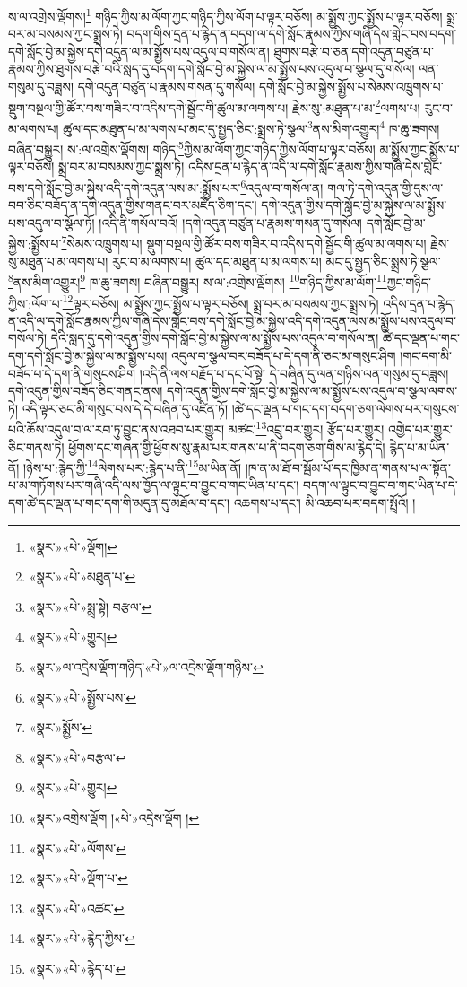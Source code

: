 ས་ལ་འགྲེས་ལྡོགས།\footnote{«སྣར་»«པེ་»ལྡོག།} གཉིད་ཀྱིས་མ་ལོག་ཀྱང་གཉིད་ཀྱིས་ལོག་པ་ལྟར་བཅོས། མ་སྨྱོས་ཀྱང་སྨྱོས་པ་ལྟར་བཅོས། སྨྲ་བར་མ་བསམས་ཀྱང་སྨྲས་ཏེ། བདག་གིས་དྲན་པ་རྙེད་ན་བདག་ལ་དགེ་སློང་རྣམས་ཀྱིས་གཞི་དེས་གླེང་བས་བདག་དགེ་སློང་བྱེ་མ་སྐྱེས་དགེ་འདུན་ལ་མ་སྨྱོས་པས་འདུལ་བ་གསོལ་ན། ཐུགས་བརྩེ་བ་ཅན་དགེ་འདུན་བཙུན་པ་རྣམས་ཀྱིས་ཐུགས་བརྩེ་བའི་སླད་དུ་བདག་དགེ་སློང་བྱེ་མ་སྐྱེས་ལ་མ་སྨྱོས་པས་འདུལ་བ་སྩལ་དུ་གསོལ། ལན་གསུམ་དུ་བཟླས། དགེ་འདུན་བཙུན་པ་རྣམས་གསན་དུ་གསོལ། དགེ་སློང་བྱེ་མ་སྐྱེས་སྨྱོས་པ་སེམས་འཁྲུགས་པ་སྡུག་བསྔལ་གྱི་ཚོར་བས་གཟིར་བ་འདིས་དགེ་སྦྱོང་གི་ཚུལ་མ་ལགས་པ། རྗེས་སུ་:མཐུན་པ་མ་\footnote{«སྣར་»«པེ་»མཐུན་པ་}ལགས་པ། རུང་བ་མ་ལགས་པ། ཚུལ་དང་མཐུན་པ་མ་ལགས་པ་མང་དུ་སྤྱད་ཅིང་:སྨྲས་ཏེ་སྩལ་\footnote{«སྣར་»«པེ་»སྨྲ་སྟེ། བརྩལ་}ནས་མིག་འགྱུར།\footnote{«སྣར་»«པེ་»གྱུར།} ཁ་ཆུ་ཟགས། བཞིན་བསྒྱུར། ས་:ལ་འགྲེས་ལྡོགས། གཉིད་\footnote{«སྣར་»ལ་འདྲེས་ལྡོག་གཉིད་«པེ་»ལ་འདྲེས་ལྡོག་གཉིས་}ཀྱིས་མ་ལོག་ཀྱང་གཉིད་ཀྱིས་ལོག་པ་ལྟར་བཅོས། མ་སྨྱོས་ཀྱང་སྨྱོས་པ་ལྟར་བཅོས། སྨྲ་བར་མ་བསམས་ཀྱང་སྨྲས་ཏེ། འདིས་དྲན་པ་རྙེད་ན་འདི་ལ་དགེ་སློང་རྣམས་ཀྱིས་གཞི་དེས་གླེང་བས་དགེ་སློང་བྱེ་མ་སྐྱེས་འདི་དགེ་འདུན་ལས་མ་:སྨྱོས་པར་\footnote{«སྣར་»«པེ་»སྨྱོས་པས་}འདུལ་བ་གསོལ་ན། གལ་ཏེ་དགེ་འདུན་གྱི་དུས་ལ་བབ་ཅིང་བཟོད་ན་དགེ་འདུན་གྱིས་གནང་བར་མཛོད་ཅིག་དང་། དགེ་འདུན་གྱིས་དགེ་སློང་བྱེ་མ་སྐྱེས་ལ་མ་སྨྱོས་པས་འདུལ་བ་སྩོལ་ཏོ། །འདི་ནི་གསོལ་བའོ། །དགེ་འདུན་བཙུན་པ་རྣམས་གསན་དུ་གསོལ། དགེ་སློང་བྱེ་མ་སྐྱེས་:སྨྱོས་པ་\footnote{«སྣར་»སྨྱོས་}སེམས་འཁྲུགས་པ། སྡུག་བསྔལ་གྱི་ཚོར་བས་གཟིར་བ་འདིས་དགེ་སྦྱོང་གི་ཚུལ་མ་ལགས་པ། རྗེས་སུ་མཐུན་པ་མ་ལགས་པ། རུང་བ་མ་ལགས་པ། ཚུལ་དང་མཐུན་པ་མ་ལགས་པ། མང་དུ་སྤྱད་ཅིང་སྨྲས་ཏེ་སྩལ་\footnote{«སྣར་»«པེ་»བརྩལ་}ནས་མིག་འགྱུར།\footnote{«སྣར་»«པེ་»གྱུར།} ཁ་ཆུ་ཟགས། བཞིན་བསྒྱུར། ས་ལ་:འགྲེས་ལྡོགས། \footnote{«སྣར་»འགྲེས་ལྡོག །«པེ་»འདྲེས་ལྡོག །}གཉིད་ཀྱིས་མ་ལོག་\footnote{«སྣར་»«པེ་»ལོགས་}ཀྱང་གཉིད་ཀྱིས་:ལོག་པ་\footnote{«སྣར་»«པེ་»ལྡོག་པ་}ལྟར་བཅོས། མ་སྨྱོས་ཀྱང་སྨྱོས་པ་ལྟར་བཅོས། སྨྲ་བར་མ་བསམས་ཀྱང་སྨྲས་ཏེ། འདིས་དྲན་པ་རྙེད་ན་འདི་ལ་དགེ་སློང་རྣམས་ཀྱིས་གཞི་དེས་གླེང་བས་དགེ་སློང་བྱེ་མ་སྐྱེས་འདི་དགེ་འདུན་ལས་མ་སྨྱོས་པས་འདུལ་བ་གསོལ་ཏེ། དེའི་སླད་དུ་དགེ་འདུན་གྱིས་དགེ་སློང་བྱེ་མ་སྐྱེས་ལ་མ་སྨྱོས་པས་འདུལ་བ་གསོལ་ན། ཚེ་དང་ལྡན་པ་གང་དག་དགེ་སློང་བྱེ་མ་སྐྱེས་ལ་མ་སྨྱོས་པས། འདུལ་བ་སྩལ་བར་བཟོད་པ་དེ་དག་ནི་ཅང་མ་གསུང་ཤིག །གང་དག་མི་བཟོད་པ་དེ་དག་ནི་གསུངས་ཤིག །འདི་ནི་ལས་བརྗོད་པ་དང་པོ་སྟེ། དེ་བཞིན་དུ་ལན་གཉིས་ལན་གསུམ་དུ་བཟླས། དགེ་འདུན་གྱིས་བཟོད་ཅིང་གནང་ནས། དགེ་འདུན་གྱིས་དགེ་སློང་བྱེ་མ་སྐྱེས་ལ་མ་སྨྱོས་པས་འདུལ་བ་སྩལ་ལགས་ཏེ། འདི་ལྟར་ཅང་མི་གསུང་བས་དེ་དེ་བཞིན་དུ་འཛིན་ཏོ། །ཚེ་དང་ལྡན་པ་གང་དག་བདག་ཅག་ལེགས་པར་གསུངས་པའི་ཆོས་འདུལ་བ་ལ་རབ་ཏུ་བྱུང་ནས་འཐབ་པར་གྱུར། མཚང་\footnote{«སྣར་»«པེ་»འཚང་}འབྲུ་བར་གྱུར། རྩོད་པར་གྱུར། འགྱེད་པར་གྱུར་ཅིང་གནས་ཏེ། ཕྱོགས་དང་གཞན་གྱི་ཕྱོགས་སུ་རྣམ་པར་གནས་པ་ནི་བདག་ཅག་གིས་མ་རྙེད་དེ། རྙེད་པ་མ་ཡིན་ནོ། །ཉེས་པ་:རྙེད་ཀྱི་\footnote{«སྣར་»«པེ་»རྙེད་ཀྱིས་}ལེགས་པར་:རྙེད་པ་ནི་\footnote{«སྣར་»«པེ་»རྙེད་པ་}མ་ཡིན་ནོ། །ཁ་ན་མ་ཐོ་བ་སྦོམ་པོ་དང་ཁྱིམ་ན་གནས་པ་ལ་སྟོན་པ་མ་གཏོགས་པར་གཞི་འདི་ལས་ཁྱོད་ལ་ལྟུང་བ་བྱུང་བ་གང་ཡིན་པ་དང་། བདག་ལ་ལྟུང་བ་བྱུང་བ་གང་ཡིན་པ་དེ་དག་ཚེ་དང་ལྡན་པ་གང་དག་གི་མདུན་དུ་མཐོལ་བ་དང་། འཆགས་པ་དང་། མི་འཆབ་པར་བདག་སྤྲོའོ། །
